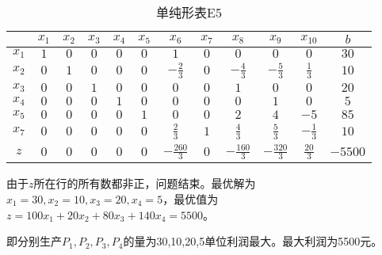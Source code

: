 \begin{solution}
    \begin{table}[!h]
        \centering
        \caption{单纯形表E5}
        \label{te5}
        \begin{tabular}{c|ccccccccccc} 
        \toprule
                 &$x_1$  &$x_2$  &$x_3$  &$x_4$  &$x_5$  &$x_6$  &$x_7$  &$x_8$  &$x_9$  &$x_{10}$ &$b$    \\\hline
        $x_1$    &$1$    &$0$    &$0$    &$0$    &$0$    &$1$    &$0$    &$0$    &$0$    &$0$      &$30$   \\
        $x_{2}$  &$0$    &$1$    &$0$    &$0$    &$0$    &$-\frac{2}{3}$   &$0$    &$-\frac{4}{3}$   &$-\frac{5}{3}$   &$\frac{1}{3}$      &$10$   \\
        $x_3$    &$0$    &$0$    &$1$    &$0$    &$0$    &$0$    &$0$    &$1$    &$0$    &$0$      &$20$   \\
        $x_4$    &$0$    &$0$    &$0$    &$1$    &$0$    &$0$    &$0$    &$0$    &$1$    &$0$      &$5$    \\
        $x_5$    &$0$    &$0$    &$0$    &$0$    &$1$    &$0$    &$0$    &$2$    &$4$    &$-5$     &$85$   \\
        $x_7$    &$0$    &$0$    &$0$    &$0$    &$0$    &$\frac{2}{3}$    &$1$    &$\frac{4}{3}$    &$\frac{5}{3}$    &$-\frac{1}{3}$      &$10$   \\
        $z$      &$0$    &$0$    &$0$    &$0$    &$0$    &$-\frac{260}{3}$ &$0$    &$-\frac{160}{3}$ &$-\frac{320}{3}$ &$\frac{20}{3}$      &$-5500$ \\
        \bottomrule
        \end{tabular}
     \end{table}

     由于$z$所在行的所有数都非正，问题结束。最优解为$x_1=30,x_2=10,x_3=20,x_4=5$，最优值为$z = 100x_1 + 20x_2 + 80x_3 + 140x_4 = 5500$。

    即分别生产$P_1,P_2,P_3,P_4$的量为30,10,20,5单位利润最大。最大利润为5500元。
\end{solution}